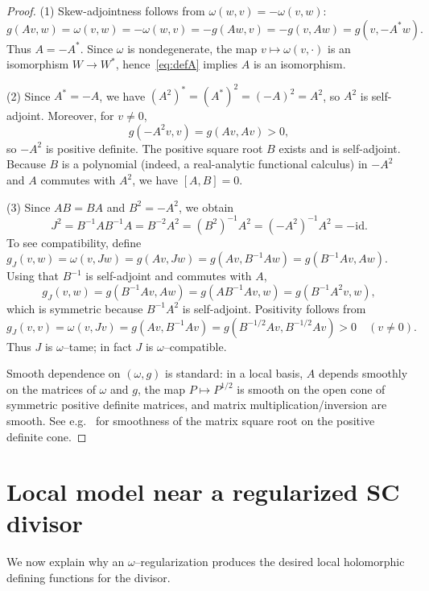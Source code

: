 \documentclass[11pt]{article}
\theoremstyle{definition}
\begin{document}
\begin{proof}
(1) Skew-adjointness follows from $\omega(w,v)=-\omega(v,w)$:
\[
g(Av,w)=\omega(v,w)=-\omega(w,v)=-g(Aw,v)=-g(v,Aw)=g(v,-A^\ast w).
\]
Thus $A=-A^\ast$. Since $\omega$ is nondegenerate, the map $v\mapsto \omega(v,\cdot)$ is an isomorphism
$W\to W^\ast$, hence~\eqref{eq:defA} implies $A$ is an isomorphism.

(2) Since $A^\ast=-A$, we have $(A^2)^\ast=(A^\ast)^2=(-A)^2=A^2$, so $A^2$ is self-adjoint.
Moreover, for $v\neq 0$,
\[
g(-A^2v,v)=g(Av,Av)>0,
\]
so $-A^2$ is positive definite. The positive square root $B$ exists and is self-adjoint.
Because $B$ is a polynomial (indeed, a real-analytic functional calculus) in $-A^2$ and $A$ commutes with $A^2$,
we have $[A,B]=0$.

(3) Since $AB=BA$ and $B^2=-A^2$, we obtain
\[
J^2 = B^{-1}AB^{-1}A = B^{-2}A^2 = (B^2)^{-1}A^2 = (-A^2)^{-1}A^2=-\mathrm{id}.
\]
To see compatibility, define $g_J(v,w)=\omega(v,Jw)=g(Av,Jw)=g(Av,B^{-1}Aw)=g(B^{-1}Av,Aw)$.
Using that $B^{-1}$ is self-adjoint and commutes with $A$,
\[
g_J(v,w)=g(B^{-1}Av,Aw)=g(A B^{-1}Av,w)=g(B^{-1}A^2v,w),
\]
which is symmetric because $B^{-1}A^2$ is self-adjoint. Positivity follows from
\[
g_J(v,v)=\omega(v,Jv)=g(Av,B^{-1}Av)=g(B^{-1/2}Av,B^{-1/2}Av)>0\quad(v\neq 0).
\]
Thus $J$ is $\omega$--tame; in fact $J$ is $\omega$--compatible.

Smooth dependence on $(\omega,g)$ is standard: in a local basis, $A$ depends smoothly on the matrices of
$\omega$ and $g$, the map $P\mapsto P^{1/2}$ is smooth on the open cone of symmetric positive definite matrices,
and matrix multiplication/inversion are smooth. See e.g.\ \cite[Ch.~6]{BhatiaMatrixAnalysis} for smoothness of
the matrix square root on the positive definite cone.
\end{proof}

\section{Local model near a regularized SC divisor}

We now explain why an $\omega$--regularization produces the desired local holomorphic defining functions for
the divisor.
\end{document}
